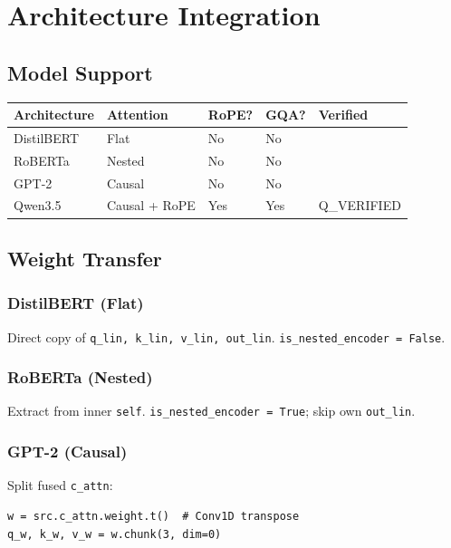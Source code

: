 
\section{Architecture Integration}

\subsection{Model Support}

\begin{table}[H]
\centering
\small
\begin{tabular}{lllll}
\toprule
\textbf{Architecture} & \textbf{Attention} & \textbf{RoPE?} & \textbf{GQA?} & \textbf{Verified} \\
\midrule
DistilBERT & Flat & No & No &  \\
RoBERTa & Nested & No & No &  \\
GPT-2 & Causal & No & No &  \\
Qwen3.5 & Causal + RoPE & Yes & Yes & {{Q\_VERIFIED}} \\
\bottomrule
\end{tabular}
\end{table}

\subsection{Weight Transfer}

\subsubsection{DistilBERT (Flat)}

Direct copy of \texttt{q\_lin, k\_lin, v\_lin, out\_lin}. \texttt{is\_nested\_encoder = False}.

\subsubsection{RoBERTa (Nested)}

Extract from inner \texttt{self}. \texttt{is\_nested\_encoder = True}; skip own \texttt{out\_lin}.

\subsubsection{GPT-2 (Causal)}

Split fused \texttt{c\_attn}:

\begin{lstlisting}
w = src.c_attn.weight.t()  # Conv1D transpose
q_w, k_w, v_w = w.chunk(3, dim=0)
\end{lstlisting}

